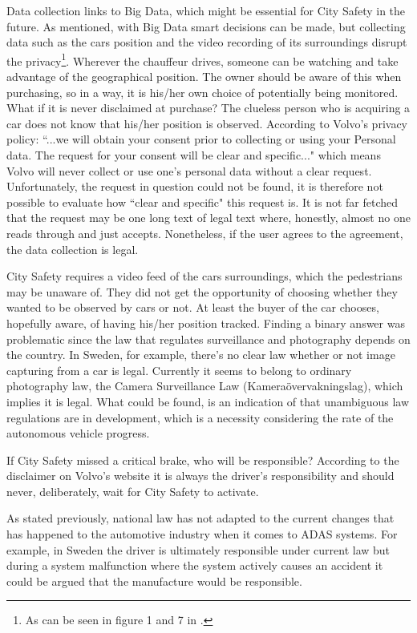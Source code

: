 \documentclass[conference]{IEEEtran}
\begin{document}
Data collection links to Big Data, which might be essential for City Safety in the future. As mentioned, with Big Data smart decisions can be made, but collecting data such as the cars position and the video recording of its surroundings disrupt the privacy\footnote{As can be seen in figure 1 and 7 in \cite{SysDescription}.}. Wherever the chauffeur drives, someone can be watching and take advantage of the geographical position. The owner should be aware of this when purchasing, so in a way, it is his/her own choice of potentially being monitored. What if it is never disclaimed at purchase? The clueless person who is acquiring a car does not know that his/her position is observed. According to Volvo's privacy policy: ``...we will obtain your consent prior to collecting or using your Personal data. The request for your consent will be clear and specific..." which means Volvo will never collect or use one's personal data without a clear request. \cite{PrivacyPolicy} Unfortunately, the request in question could not be found, it is therefore not possible to evaluate how ``clear and specific" this request is. It is not far fetched that the request may be one long text of legal text where, honestly, almost no one reads through and just accepts. Nonetheless, if the user agrees to the agreement, the data collection is legal.

City Safety requires a video feed of the cars surroundings, which the pedestrians may be unaware of. They did not get the opportunity of choosing whether they wanted to be observed by cars or not. At least the buyer of the car chooses, hopefully aware, of having his/her position tracked. Finding a binary answer was problematic since the law that regulates surveillance and photography depends on the country. In Sweden, for example, there's no clear law whether or not image capturing from a car is legal. Currently it seems to belong to ordinary photography law, the Camera Surveillance Law (Kamera\"overvakningslag), which implies it is legal. \cite{LegalSweden} What could be found, is an indication of that unambiguous law regulations are in development, which is a necessity considering the rate of the autonomous vehicle progress. \cite{LegalSweden2}

If City Safety missed a critical brake, who will be responsible? According to the disclaimer on Volvo's website it is always the driver's responsibility and should never, deliberately, wait for City Safety to activate. \cite{CitySafetyLegal} 

As stated previously, national law has not adapted to the current changes that has happened to the automotive industry when it comes to ADAS systems. For example, in Sweden the driver is ultimately responsible under current law but during a system malfunction where the system actively causes an accident it could be argued that the manufacture would be responsible. \cite{LegalSweden3}
\end{document}
